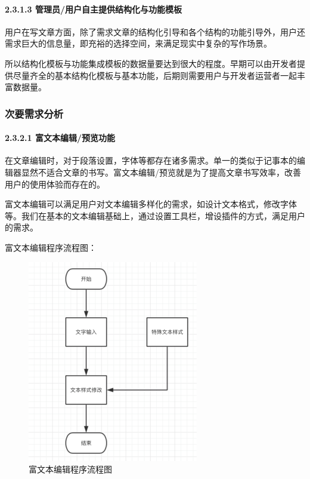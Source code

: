 \documentclass[10pt,letterpaper]{article}
\begin{document}
\paragraph{2.3.1.3 管理员/用户自主提供结构化与功能模板}

\rule{0pt}{0pt} 

用户在写文章方面，除了需求文章的结构化引导和各个结构的功能引导外，用户还需求巨大的信息量，即充裕的选择空间，来满足现实中复杂的写作场景。

所以结构化模板与功能集成模板的数据量要达到很大的程度。早期可以由开发者提供尽量齐全的基本结构化模板与基本功能，后期则需要用户与开发者运营者一起丰富数据量。

\subsubsection{次要需求分析}
\paragraph{2.3.2.1 富文本编辑/预览功能}
\rule{0pt}{0pt} 

在文章编辑时，对于段落设置，字体等都存在诸多需求。单一的类似于记事本的编辑器显然不适合文章的书写。富文本编辑/预览就是为了提高文章书写效率，改善用户的使用体验而存在的。

富文本编辑可以满足用户对文本编辑多样化的需求，如设计文本格式，修改字体等。我们在基本的文本编辑基础上，通过设置工具栏，增设插件的方式，满足用户的需求。

富文本编辑程序流程图：

\begin{figure}[H]
	\begin{center}
		\includegraphics[width=0.5\linewidth]{___7.png}
		\caption{富文本编辑程序流程图}
		\label{Fig:1}
	\end{center}
	\vspace{-0.5em}
\end{figure}
\end{document}
